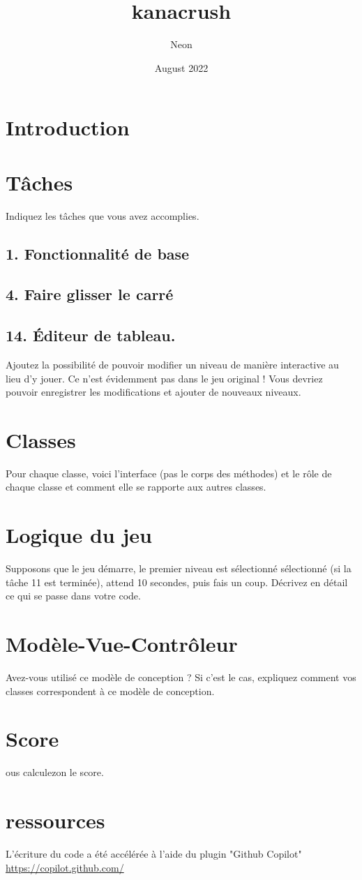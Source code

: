 \documentclass{article}
\title{kanacrush}
\author{Neon }
\date{August 2022}
\begin{document}
\maketitle
\tableofcontents
\newpage


\section{Introduction}
\section{Tâches }
 Indiquez les tâches que vous avez accomplies.

\subsection{1. Fonctionnalité de base}
\subsection{4. Faire glisser le carré}
\subsection{14. Éditeur de tableau.  }
Ajoutez la possibilité de pouvoir modifier un niveau de manière
interactive au lieu d’y jouer. Ce n’est évidemment pas dans le jeu original ! Vous devriez
pouvoir enregistrer les modifications et ajouter de nouveaux niveaux.
\section{Classes }
Pour chaque classe, voici l’interface (pas le corps des méthodes) et  le rôle de chaque classe et comment elle se rapporte aux autres classes.
\section{Logique du jeu}
Supposons que le jeu démarre,  le premier niveau est sélectionné sélectionné (si la
tâche 11 est terminée), attend  10 secondes, puis fais un coup. Décrivez en détail ce qui
se passe dans votre code.
\section{Modèle-Vue-Contrôleur}
Avez-vous utilisé ce modèle de conception ? Si c’est le cas, expliquez comment vos classes correspondent à ce modèle de conception.

\section{Score}
ous calculezon le score.


\section{ressources}




L'écriture du code a été accélérée à l'aide du plugin "Github Copilot"
\href{https://copilot.github.com/}{https://copilot.github.com/}
\end{document}
